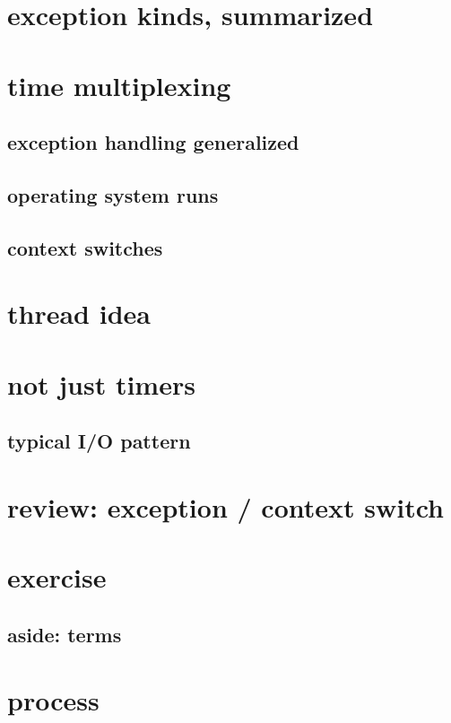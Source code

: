 
\section{exception kinds, summarized}


\section{time multiplexing}


\subsection{exception handling generalized}


\subsection{operating system runs}


\subsection{context switches} 


\section{thread idea}


\section{not just timers}

\subsection{typical I/O pattern}




\section{review: exception / context switch}


\section{exercise}


\subsection{aside: terms}



\section{process}


